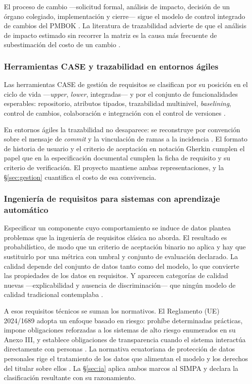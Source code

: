 El proceso de cambio ---solicitud formal, análisis de impacto, decisión de un órgano colegiado,
implementación y cierre--- sigue el modelo de control integrado de cambios del PMBOK
\cite{pmbok7}. La literatura de trazabilidad advierte de que el análisis de impacto estimado sin
recorrer la matriz es la causa más frecuente de subestimación del costo de un cambio
\cite{clelandhuang2012}.

\subsubsection*{Herramientas CASE y trazabilidad en entornos ágiles}

Las herramientas CASE de gestión de requisitos se clasifican por su posición en el ciclo de vida
---\emph{upper}, \emph{lower}, integradas--- y por el conjunto de funcionalidades esperables:
repositorio, atributos tipados, trazabilidad multinivel, \emph{baselining}, control de cambios,
colaboración e integración con el control de versiones \cite{wiegers2013}.

En entornos ágiles la trazabilidad no desaparece: se reconstruye por convención sobre el mensaje de
\emph{commit} y la vinculación de ramas a la incidencia \cite{clelandhuang2012}. El formato de
historia de usuario \cite{cohn2004} y el criterio de aceptación en notación Gherkin \cite{smart2014}
cumplen el papel que en la especificación documental cumplen la ficha de requisito y su criterio de
verificación. El proyecto mantiene ambas representaciones, y la \S\ref{sec:gestion} cuantifica el
costo de esa convivencia.

\subsubsection*{Ingeniería de requisitos para sistemas con aprendizaje automático}

Especificar un componente cuyo comportamiento se induce de datos plantea problemas que la ingeniería
de requisitos clásica no aborda. El resultado es probabilístico, de modo que un criterio de
aceptación binario no aplica y hay que sustituirlo por una métrica con umbral y conjunto de
evaluación declarado. La calidad depende del conjunto de datos tanto como del modelo, lo que convierte
las propiedades de los datos en requisitos. Y aparecen categorías de calidad nuevas ---explicabilidad
y ausencia de discriminación--- que ningún modelo de calidad tradicional contemplaba
\cite{vogelsang2024, chazette2021}.

A esos requisitos técnicos se suman los normativos. El Reglamento (UE) 2024/1689 adopta un enfoque
basado en riesgo: prohíbe determinadas prácticas, impone obligaciones reforzadas a los sistemas de
alto riesgo enumerados en su Anexo III, y establece obligaciones de transparencia cuando el sistema
interactúa directamente con personas \cite{aiact2024}. La normativa ecuatoriana de protección de
datos personales rige el tratamiento de los datos que alimentan el modelo y los derechos del titular
sobre ellos \cite{lopdp2021}. La \S\ref{sec:ia} aplica ambos marcos al SIMPA y declara la
clasificación resultante con su razonamiento.

